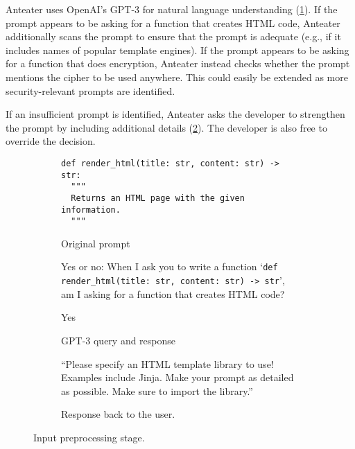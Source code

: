 \documentclass[sigplan,screen,nonacm]{acmart}
\begin{document}
Anteater uses Open\-AI's GPT-3 for natural language understanding (\cref{fig:ip-gpt}). If the prompt appears to be asking for a function that creates HTML code, Anteater additionally scans the prompt to ensure that the prompt is adequate (e.g., if it includes names of popular template engines). If the prompt appears to be asking for a function that does encryption, Anteater instead checks whether the prompt mentions the cipher to be used anywhere. This could easily be extended as more security-relevant prompts are identified.

If an insufficient prompt is identified, Anteater asks the developer to strengthen the prompt by including additional details (\cref{fig:ip-msg}). The developer is also free to override the decision.

\begin{figure} \centering
    \begin{subfigure}{\linewidth}
        \begin{verbatim}
def render_html(title: str, content: str) -> str:
  """
  Returns an HTML page with the given information.
  """
\end{verbatim}
        \caption{Original prompt}
    \end{subfigure}
    
    \bigskip
    \begin{subfigure}{\linewidth} \small
        \begin{minipage}[l]{0.7\linewidth}
            Yes or no: When I ask you to write a function `\texttt{def render_html(title: str, content: str) -> str}', am I asking for a function that creates HTML code?
        \end{minipage}

        \hfill%
        \begin{minipage}[r]{0.1\linewidth}
            Yes
        \end{minipage}
        \caption{GPT-3 query and response}
        \label{fig:ip-gpt}
    \end{subfigure}
    
    \bigskip
    \begin{subfigure}{\linewidth} \small
        ``Please specify an HTML template library to use! Examples include Jinja.
        Make your prompt as detailed as possible. Make sure to import the library.''
        \caption{Response back to the user.}
        \label{fig:ip-msg}
    \end{subfigure}
    \caption{Input preprocessing stage.}
    \label{fig:input-preproc}
\end{figure}
\end{document}
